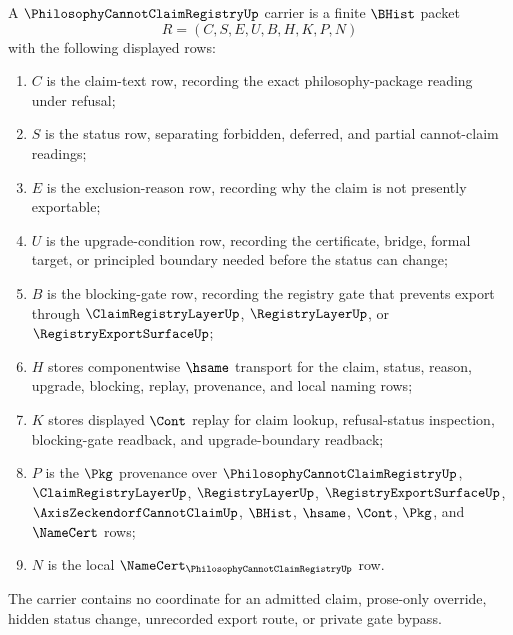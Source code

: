 \begin{definition}
\label{def:philosophy-cannot-claim-registry-carrier}
A $\PhilosophyCannotClaimRegistryUp$ carrier is a finite $\BHist$ packet
$$
R=(C,S,E,U,B,H,K,P,N)
$$
with the following displayed rows:
\begin{enumerate}
\item $C$ is the claim-text row, recording the exact philosophy-package reading under refusal;
\item $S$ is the status row, separating forbidden, deferred, and partial cannot-claim readings;
\item $E$ is the exclusion-reason row, recording why the claim is not presently exportable;
\item $U$ is the upgrade-condition row, recording the certificate, bridge, formal target, or principled boundary needed before the status can change;
\item $B$ is the blocking-gate row, recording the registry gate that prevents export through $\ClaimRegistryLayerUp$, $\RegistryLayerUp$, or $\RegistryExportSurfaceUp$;
\item $H$ stores componentwise $\hsame$ transport for the claim, status, reason, upgrade, blocking, replay, provenance, and local naming rows;
\item $K$ stores displayed $\Cont$ replay for claim lookup, refusal-status inspection, blocking-gate readback, and upgrade-boundary readback;
\item $P$ is the $\Pkg$ provenance over $\PhilosophyCannotClaimRegistryUp$, $\ClaimRegistryLayerUp$, $\RegistryLayerUp$, $\RegistryExportSurfaceUp$, $\AxisZeckendorfCannotClaimUp$, $\BHist$, $\hsame$, $\Cont$, $\Pkg$, and $\NameCert$ rows;
\item $N$ is the local $\NameCert_{\PhilosophyCannotClaimRegistryUp}$ row.
\end{enumerate}
The carrier contains no coordinate for an admitted claim, prose-only override, hidden status change, unrecorded export route, or private gate bypass.
\end{definition}

